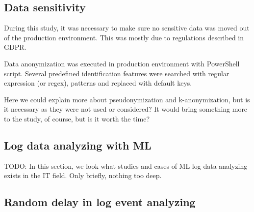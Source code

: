 
\subsection{Data sensitivity}\label{subsec:bg-data-sensitivity}

During this study,
it was necessary to make sure no sensitive data
was moved out of the production environment.
This was mostly due to regulations described in GDPR. %

Data anonymization was executed in production environment
with PowerShell script.
Several predefined identification features were searched with
regular expression (or regex), patterns and replaced with
default keys.

\begin{itcomment} %
    Here we could explain more about pseudonymization and k-anonymization,
    but is it necessary as they were not used or considered?
    It would bring something more to the study, of course,
    but is it worth the time?
\end{itcomment}



\subsection{Log data analyzing with ML}\label{subsec:bg-log-data-analyzing-with-ml}
TODO: In this section, we look
what studies and cases of ML log data analyzing exists in the IT field.
Only briefly, nothing too deep.



\subsection{Random delay in log event analyzing}\label{subsec:bg-random-delay}

